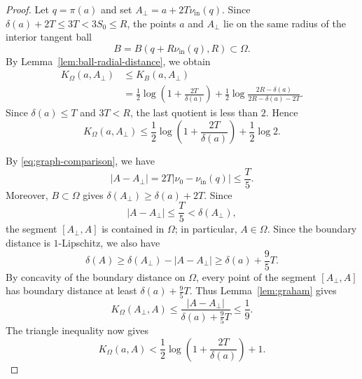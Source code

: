 \documentclass[11pt]{article}
\theoremstyle{definition}
\begin{document}
\begin{proof}
Let \(q=\pi(a)\) and set
\(A_\perp=a+2T\nu_{\mathrm{in}}(q)\).
Since \(\delta(a)+2T\le3T<3S_0\le R\), the points \(a\) and
\(A_\perp\) lie on the same radius of the interior tangent ball
\[
B=B(q+R\nu_{\mathrm{in}}(q),R)\subset\Omega.
\]
By Lemma~\ref{lem:ball-radial-distance}, we obtain
\[
\begin{aligned}
K_\Omega(a,A_\perp)
&\le K_B(a,A_\perp)\\
&=
\frac12\log\left(1+\frac{2T}{\delta(a)}\right)
+
\frac12\log
\frac{2R-\delta(a)}
     {2R-\delta(a)-2T}.
\end{aligned}
\]
Since \(\delta(a)\le T\) and \(3T<R\), the last quotient is less than
\(2\).  Hence
\[
K_\Omega(a,A_\perp)
\le
\frac12\log\left(1+\frac{2T}{\delta(a)}\right)
+\frac12\log2.
\]

By \eqref{eq:graph-comparison}, we have
\[
|A-A_\perp|
=
2T|\nu_0-\nu_{\mathrm{in}}(q)|
\le \frac{T}{5}.
\]
Moreover, \(B\subset\Omega\) gives
\(\delta(A_\perp)\ge\delta(a)+2T\).
Since
\[
|A-A_\perp|
\le\frac T5
<\delta(A_\perp),
\]
the segment \([A_\perp,A]\) is contained in \(\Omega\); in particular,
\(A\in\Omega\).  Since the boundary distance is \(1\)-Lipschitz, we
also have
\[
\delta(A)\ge\delta(A_\perp)-|A-A_\perp|
\ge\delta(a)+\frac95T.
\]
By concavity of the boundary distance on \(\Omega\), every point of the
segment \([A_\perp,A]\) has boundary distance at least
\(\delta(a)+\frac95T\).  Thus Lemma~\ref{lem:graham} gives
\[
K_\Omega(A_\perp,A)
\le
\frac{|A-A_\perp|}
     {\delta(a)+\frac95T}
\le\frac19.
\]
The triangle inequality now gives
\[
K_\Omega(a,A)
<
\frac12\log\left(1+\frac{2T}{\delta(a)}\right)+1.
\]
\end{proof}
\end{document}
